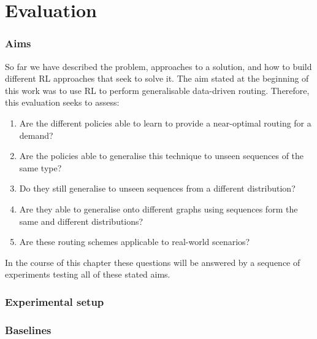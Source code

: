 \chapter{Evaluation}
\label{chapter:evaluation}

\subsection{Aims}
So far we have described the problem, approaches to a solution, and how to build different RL approaches that seek to solve it. The aim stated at the beginning of this work was to use RL to perform generalisable data-driven routing. Therefore, this evaluation seeks to assess:

\begin{enumerate}
\item Are the different policies able to learn to provide a near-optimal routing for a demand?
\item Are the policies able to generalise this technique to unseen sequences of the same type?
\item Do they still generalise to unseen sequences from a different distribution?
\item Are they able to generalise onto different graphs using sequences form the same and different distributions?
\item Are these routing schemes applicable to real-world scenarios?
\end{enumerate}

In the course of this chapter these questions will be answered by a sequence of experiments testing all of these stated aims.

\subsection{Experimental setup}


\subsection{Baselines}


